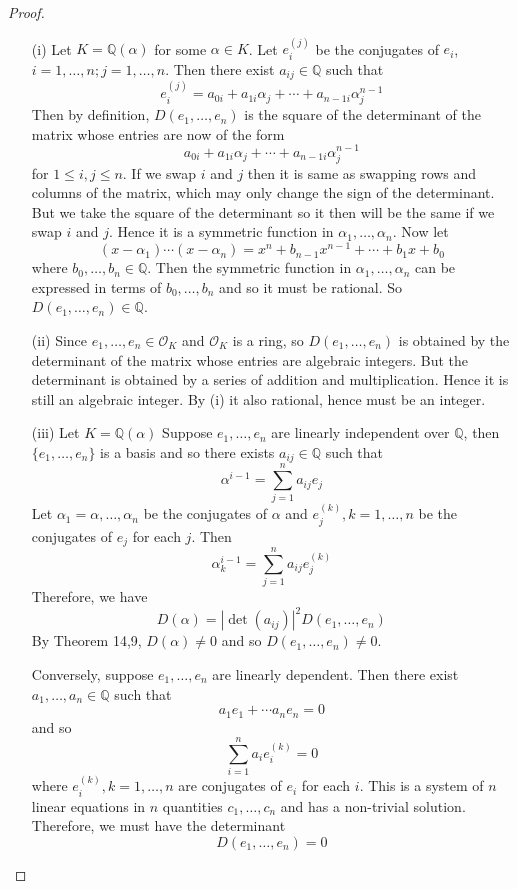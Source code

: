 \begin{proof}
\begin{enumerate}
\item[(i)] Let $K=\mathbb{Q}(\alpha)$ for some $\alpha \in K$. Let $e^{(j)}_i$ be the conjugates of $e_i$,
$i=1,\ldots,n; j=1,\ldots,n$. Then there exist $a_{ij} \in \mathbb{Q}$ such that
$$e^{(j)}_i=a_{0i}+a_{1i}\alpha_j+\cdots+a_{n-1 i}\alpha^{n-1}_j$$
Then by definition, $D(e_1,\ldots,e_n)$ is the square of the determinant of the matrix whose entries are now of the form
$$a_{0i}+a_{1i}\alpha_j+\cdots+a_{n-1 i}\alpha^{n-1}_j$$
for $1 \le i,j \le n$. If we swap $i$ and $j$ then it is same as swapping rows and columns of the matrix, which may only change the sign of the determinant. But we take the square of the determinant so it then will be the same if we swap $i$ and $j$. Hence it is a symmetric function in $\alpha_1,\ldots,\alpha_n$. Now let
$$(x-\alpha_1)\cdots(x-\alpha_n)=x^n+b_{n-1}x^{n-1}+\cdots+b_1x+b_0$$
where $b_0,\ldots,b_n \in \mathbb{Q}$.
Then the symmetric function in $\alpha_1,\ldots,\alpha_n$ can be expressed in terms of $b_0,\ldots,b_n$ and so it must be rational. So $D(e_1,\ldots,e_n) \in \mathbb{Q}$.
\item[(ii)] Since $e_1,\ldots,e_n \in \mathcal{O}_K$ and $\mathcal{O}_K$ is a ring, so $D(e_1,\ldots,e_n)$ is obtained by the determinant of the matrix whose entries are algebraic integers. But the determinant is obtained by a series of addition and multiplication. Hence it is still an algebraic integer. By (i) it also rational, hence must be an integer.
\item[(iii)]  Let $K=\mathbb{Q}(\alpha)$ Suppose $e_1,\ldots,e_n$ are linearly independent over $\mathbb{Q}$, then $\{e_1,\ldots,e_n\}$ is a basis and so there exists $a_{ij} \in \mathbb{Q}$ such that
$$\alpha^{i-1}=\sum_{j=1}^n a_{ij}e_j$$
Let $\alpha_1=\alpha,\ldots,\alpha_n$ be the conjugates of $\alpha$ and
$e^{(k)}_j, k=1,\ldots,n$ be the conjugates of $e_j$ for each $j$.
Then
$$\alpha^{i-1}_k=\sum_{j=1}^n a_{ij}e^{(k)}_j$$
Therefore, we have
$$D(\alpha)=|\det{(a_{ij})}|^2 D(e_1,\ldots,e_n)$$
By Theorem 14,9, $D(\alpha) \neq 0$ and so $D(e_1,\ldots,e_n) \neq 0$.

Conversely, suppose $e_1,\ldots,e_n$ are linearly dependent. Then there exist $a_1,\ldots,a_n \in \mathbb{Q}$
such that
$$a_1e_1+\cdots a_ne_n=0$$
and so
$$\sum_{i=1}^n a_i e^{(k)}_i=0$$
where $e^{(k)}_i, k=1,\ldots,n$ are conjugates of $e_i$ for each $i$.
This is a system of $n$ linear equations in $n$ quantities $c_1,\ldots,c_n$ and has a non-trivial solution. Therefore, we must have the determinant
$$D(e_1,\ldots,e_n)=0$$
\end{enumerate}
\end{proof}
